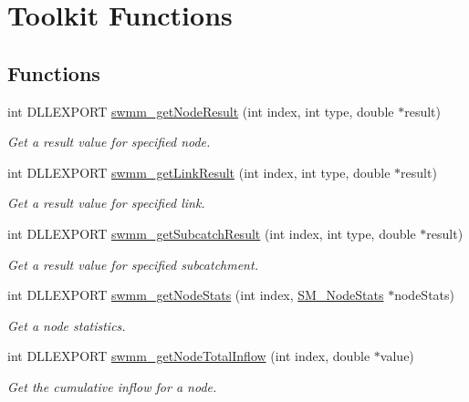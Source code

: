 \hypertarget{group__tkfuncs}{}\section{Toolkit Functions}
\label{group__tkfuncs}
\subsection*{Functions}
\begin{DoxyCompactItemize}
\item 
int D\+L\+L\+E\+X\+P\+O\+RT \hyperlink{group__tkfuncs_gacef44d121a8f9a646f4e6f108b494373}{swmm\+\_\+get\+Node\+Result} (int index, int type, double $\ast$result)
\begin{DoxyCompactList}\small\item\em Get a result value for specified node. \end{DoxyCompactList}\item 
int D\+L\+L\+E\+X\+P\+O\+RT \hyperlink{group__tkfuncs_ga578a49668d519c8b4cdcab2227f8119b}{swmm\+\_\+get\+Link\+Result} (int index, int type, double $\ast$result)
\begin{DoxyCompactList}\small\item\em Get a result value for specified link. \end{DoxyCompactList}\item 
int D\+L\+L\+E\+X\+P\+O\+RT \hyperlink{group__tkfuncs_ga32311167c22094c1eb9aa69edee29d63}{swmm\+\_\+get\+Subcatch\+Result} (int index, int type, double $\ast$result)
\begin{DoxyCompactList}\small\item\em Get a result value for specified subcatchment. \end{DoxyCompactList}\item 
int D\+L\+L\+E\+X\+P\+O\+RT \hyperlink{group__tkfuncs_ga0d52d8f1b900a0ef3d3df309c5df21f8}{swmm\+\_\+get\+Node\+Stats} (int index, \hyperlink{struct_s_m___node_stats}{S\+M\+\_\+\+Node\+Stats} $\ast$node\+Stats)
\begin{DoxyCompactList}\small\item\em Get a node statistics. \end{DoxyCompactList}\item 
int D\+L\+L\+E\+X\+P\+O\+RT \hyperlink{group__tkfuncs_gab5d65643b9dddba000e2ae1f62ec3c59}{swmm\+\_\+get\+Node\+Total\+Inflow} (int index, double $\ast$value)
\begin{DoxyCompactList}\small\item\em Get the cumulative inflow for a node. \end{DoxyCompactList}\item 

\end{DoxyCompactItemize}
